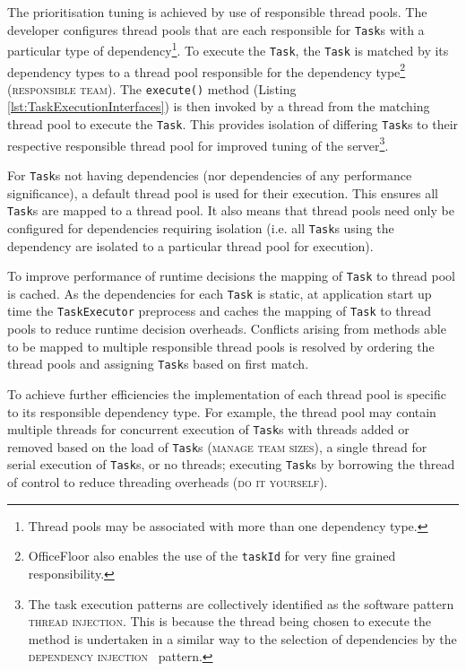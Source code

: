 \documentclass[prodmode]{style/acmlarge}
\begin{document}
The prioritisation tuning is achieved by use of responsible thread pools.  The
developer configures thread pools that are each responsible for \texttt{Task}s
with a particular type of dependency\footnote{Thread pools may be associated
with more than one dependency type.}.  To execute the \texttt{Task}, the
\texttt{Task} is matched by its dependency types to a thread pool responsible
for the dependency type\footnote{OfficeFloor also enables the use of the
\texttt{taskId} for very fine grained responsibility.} (\textsc{responsible
team}).  The \texttt{execute()} method (Listing
\ref{lst:TaskExecutionInterfaces}) is then invoked by a thread from the matching
thread pool to execute the \texttt{Task}.  This provides isolation of differing
\texttt{Task}s to their respective responsible thread pool for improved tuning
of the server\footnote{The task execution patterns are collectively identified
as the software pattern \textsc{thread injection}.  This is because the thread
being chosen to execute the method is undertaken in a similar way to the
selection of dependencies by the \textsc{dependency injection}~\cite{ioc}
pattern.}.

For \texttt{Task}s not having dependencies (nor dependencies of any performance
significance), a default thread pool is used for their execution.  This ensures
all \texttt{Task}s are mapped to a thread pool.  It also means that thread pools
need only be configured for dependencies requiring isolation (i.e. all
\texttt{Task}s using the dependency are isolated to a particular thread pool for
execution).

To improve performance of runtime decisions the mapping of \texttt{Task} to
thread pool is cached.  As the dependencies for each \texttt{Task} is static, at
application start up time the \texttt{TaskExecutor} preprocess and caches the
mapping of \texttt{Task} to thread pools to reduce runtime decision overheads.
Conflicts arising from methods able to be mapped to multiple responsible thread
pools is resolved by ordering the thread pools and assigning \texttt{Task}s
based on first match.

To achieve further efficiencies the implementation of each thread pool is
specific to its responsible dependency type.  For example, the thread pool may
contain multiple threads for concurrent execution of \texttt{Task}s with threads
added or removed based on the load of \texttt{Task}s (\textsc{manage team
sizes}), a single thread for serial execution of \texttt{Task}s, or no threads;
executing \texttt{Task}s by borrowing the thread of control to reduce threading
overheads (\textsc{do it yourself}).
\end{document}
